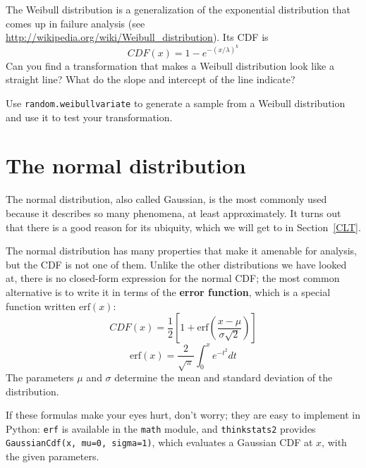 \documentclass[12pt]{book}
\begin{document}
\begin{exercise}
\label{weibull}

The Weibull distribution is a generalization of the exponential
distribution that comes up in failure analysis
(see \url{http://wikipedia.org/wiki/Weibull_distribution}).  Its CDF is
%
\[ CDF(x) = 1 - e^{-(x / \lambda)^k} \]
%
Can you find a transformation that makes a Weibull distribution look
like a straight line?  What do the slope and intercept of the
line indicate?

Use {\tt random.weibullvariate} to generate a sample from a
Weibull distribution and use it to test your transformation.

\end{exercise}


\section{The normal distribution}
\label{normal}

\newcommand{\erf}{\mathrm{erf}}

The normal distribution, also called Gaussian, is the most commonly
used because it describes so many phenomena, at least approximately.
It turns out that there is a good reason for its ubiquity, which we
will get to in Section~\ref{CLT}.

The normal distribution has many properties that make it amenable for
analysis, but the CDF is not one of them.  Unlike the
other distributions we have looked at, there is no closed-form
expression for the normal CDF; the most common alternative is to write
it in terms of the {\bf error function}, which is a special function
written $\erf(x)$:
%
\[ CDF(x) = \frac{1}{2} \left[ 1 +
  \erf \left( \frac{x - \mu}{\sigma \sqrt{2}} \right) \right] \]
%
\[ \erf(x) = \frac{2}{\sqrt{\pi}} \int_{0}^x e^{-t^2} dt \]
%
The parameters $\mu$ and $\sigma$ determine the mean and standard
deviation of the distribution.

If these formulas make your eyes hurt, don't worry; they are easy to
implement in Python: {\tt erf} is available in the {\tt math} module,
and {\tt thinkstats2} provides {\tt GaussianCdf(x, mu=0, sigma=1)},
which evaluates a Gaussian CDF at $x$, with the given parameters.
\end{document}
